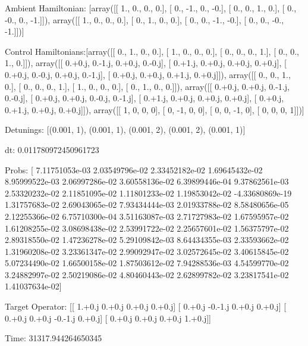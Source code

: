 \documentclass{article}
\begin{document}
    

\newpage

Ambient Hamiltonian: [array([[ 1.,  0.,  0.,  0.],
       [ 0., -1.,  0., -0.],
       [ 0.,  0.,  1.,  0.],
       [ 0., -0.,  0., -1.]]), array([[ 1.,  0.,  0.,  0.],
       [ 0.,  1.,  0.,  0.],
       [ 0.,  0., -1., -0.],
       [ 0.,  0., -0., -1.]])]

Control Hamiltonians:[array([[ 0.,  1.,  0.,  0.],
       [ 1.,  0.,  0.,  0.],
       [ 0.,  0.,  0.,  1.],
       [ 0.,  0.,  1.,  0.]]), array([[ 0.+0.j,  0.-1.j,  0.+0.j,  0.-0.j],
       [ 0.+1.j,  0.+0.j,  0.+0.j,  0.+0.j],
       [ 0.+0.j,  0.-0.j,  0.+0.j,  0.-1.j],
       [ 0.+0.j,  0.+0.j,  0.+1.j,  0.+0.j]]), array([[ 0.,  0.,  1.,  0.],
       [ 0.,  0.,  0.,  1.],
       [ 1.,  0.,  0.,  0.],
       [ 0.,  1.,  0.,  0.]]), array([[ 0.+0.j,  0.+0.j,  0.-1.j,  0.-0.j],
       [ 0.+0.j,  0.+0.j,  0.-0.j,  0.-1.j],
       [ 0.+1.j,  0.+0.j,  0.+0.j,  0.+0.j],
       [ 0.+0.j,  0.+1.j,  0.+0.j,  0.+0.j]]), array([[ 1,  0,  0,  0],
       [ 0, -1,  0,  0],
       [ 0,  0, -1,  0],
       [ 0,  0,  0,  1]])]

Detunings: [(0.001, 1), (0.001, 1), (0.001, 2), (0.001, 2), (0.001, 1)]

 dt: 0.011780972450961723

Probs: [  7.11751053e-03   2.03549796e-02   2.33452182e-02   1.69645432e-02
   8.95999522e-03   2.06997286e-02   3.60558136e-02   6.39899446e-04
   9.37862561e-03   2.53320232e-02   2.11851095e-02   1.11801233e-02
   1.19853042e-02  -4.33680869e-19   1.31757683e-02   2.69043065e-02
   7.93434444e-03   2.01933788e-02   8.58480656e-05   2.12255366e-02
   6.75710300e-04   3.51163087e-03   2.71727983e-02   1.67595957e-02
   1.61208255e-02   3.08698438e-02   2.53991722e-02   2.25657601e-02
   1.56375797e-02   2.89318550e-02   1.47236278e-02   5.29109842e-03
   8.64434355e-03   2.33593662e-02   1.31960208e-02   3.23361347e-02
   2.99092947e-02   3.02572645e-02   3.40615845e-02   5.07234490e-02
   1.66500158e-02   1.87503612e-02   7.94288536e-03   4.54599770e-02
   3.24882997e-02   2.50219086e-02   4.80460443e-02   2.62899782e-02
   3.23817541e-02   1.41037634e-02]

Target Operator: [[ 1.+0.j  0.+0.j  0.+0.j  0.+0.j]
 [ 0.+0.j -0.-1.j  0.+0.j  0.+0.j]
 [ 0.+0.j  0.+0.j -0.-1.j  0.+0.j]
 [ 0.+0.j  0.+0.j  0.+0.j  1.+0.j]]

Time: 31317.944264650345
\end{document}
